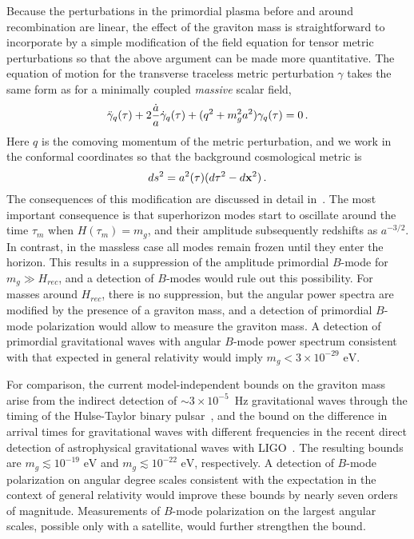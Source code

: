 Because the perturbations in the primordial plasma before and around recombination are linear, the effect of the graviton mass is straightforward to incorporate by a simple modification of the field equation for tensor metric perturbations so that the above argument can be made more quantitative. The equation of motion for the transverse traceless metric perturbation $\gamma$ takes the same form as for a minimally coupled {\it massive} scalar field,
\begin{equation}
\label{massive}
\ddot{\gamma}_q(\tau)+2{\dot a\over a} \dot{\gamma}_q(\tau)+(q^2+m_g^2 a^2) \gamma_q(\tau)=0\,.
\end{equation}
Here $q$ is the comoving momentum of the metric perturbation, and we work in the conformal coordinates so that the background cosmological metric is
\begin{equation}
ds^2= a^2(\tau)(d\tau^2-d{\bf x}^2)\,.
\end{equation}
The consequences of this modification are discussed in detail in~\cite{Dubovsky:2009xk}. The most important consequence is that superhorizon modes start to oscillate around the time $\tau_m$ when $H(\tau_m)=m_g$, and their amplitude subsequently redshifts as $a^{-3/2}$. In contrast, in the massless case all modes remain frozen until they enter the horizon. This results in a suppression of the amplitude primordial $B$-mode for $m_g\gg H_{rec}$, and a detection of $B$-modes would rule out this possibility. For masses around $H_{rec}$, there is no suppression, but the angular power spectra are modified by the presence of a graviton mass, and a detection of primordial $B$-mode polarization would allow to measure the graviton mass. A detection of primordial gravitational waves with angular $B$-mode power spectrum consistent with that expected in general relativity would imply $m_g< 3\times 10^{-29}{\mbox{ eV}}$.
 
For comparison, the current model-independent bounds on the graviton mass arise from the indirect detection of $\sim 3\times 10^{-5}$~Hz gravitational waves through the timing of the Hulse-Taylor binary pulsar~\cite{PhysRevD.65.044022}, and the bound on the difference in arrival times for gravitational waves with different frequencies in the recent direct detection of astrophysical gravitational waves with LIGO~\cite{PhysRevLett.116.061102}. The resulting bounds are $m_g\lesssim 10^{-19}{\mbox{ eV}}$ and $m_g\lesssim 10^{-22}{\mbox{ eV}}$, respectively. A detection of $B$-mode polarization on angular degree scales consistent with the expectation in the context of general relativity would improve these bounds by nearly seven orders of magnitude. Measurements of $B$-mode polarization on the largest angular scales, possible only with a satellite, would further strengthen the bound. 

